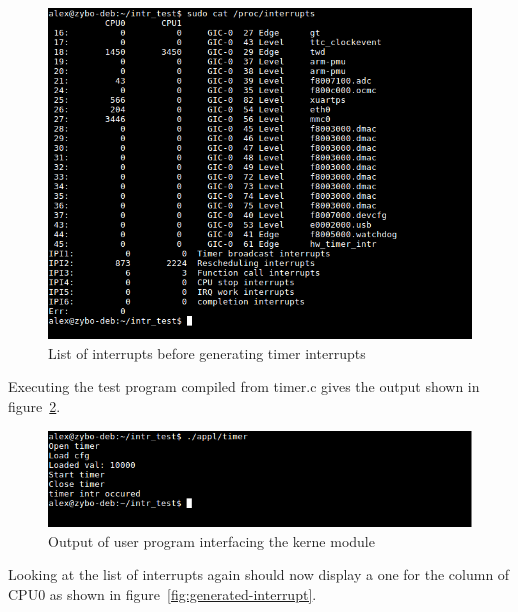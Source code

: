\begin{figure}[ht]
    \centering
    \includegraphics[width=1.0\textwidth,height=1.0\textheight,keepaspectratio]{figures/interrupt_entry.png}
    \caption{List of interrupts before generating timer interrupts}
    \label{fig:interrupt-list}
\end{figure}

Executing the test program compiled from timer.c gives the output shown in figure~\ref{fig:user-program}.

\begin{figure}[ht]
    \centering
    \includegraphics[width=1.0\textwidth,height=1.0\textheight,keepaspectratio]{figures/execute_user.png}
    \caption{Output of user program interfacing the kerne module}
    \label{fig:user-program}
\end{figure}

Looking at the list of interrupts again should now display a one for the column of CPU0 as shown in figure~\ref{fig:generated-interrupt}.

